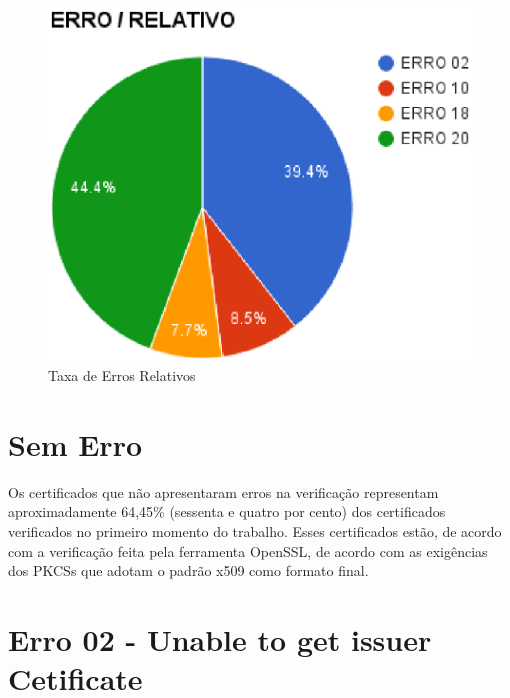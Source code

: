 	\begin{figure}[h]
		\centering
		\caption{Taxa de Erros Relativos}
		\label{graph02}
		\includegraphics[keepaspectratio=true,scale=1]{figuras/erRel.eps}
	\end{figure}

\section[Sem Erro]{Sem Erro}


	Os certificados que não apresentaram erros na verificação representam aproximadamente 64,45\% (sessenta e quatro por cento) dos certificados verificados no primeiro momento do trabalho. Esses certificados estão, de acordo com a verificação feita pela ferramenta OpenSSL, de acordo com as exigências dos PKCSs que adotam o padrão x509 como formato final.

\section[Erro 02 - Unable to get issuer Cetificate]{Erro 02 - Unable to get issuer Cetificate}


